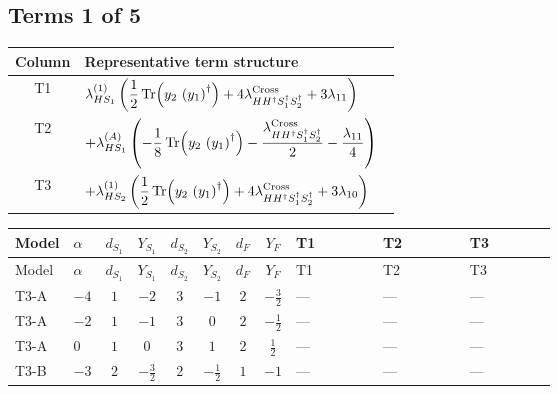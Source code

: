 \documentclass[8pt]{article}
\begin{document}
\begin{landscape}
\subsection*{Terms 1 of 5}
\begin{center}
\begin{tabular}{@{}c >{\raggedright\arraybackslash}p{0.82\linewidth}@{}}
\toprule
Column & Representative term structure \\
\midrule
T1 & \(\displaystyle {\lambda_{HS_1}^{(1)}} \left(\frac{1}{2} \operatorname{Tr}\!\left({y_2}\,\left({y_1}\right)^{\dagger}\right)+4 {\lambda_{H H^\dagger S_1^\dagger S_2^\dagger}^{\rm Cross}}+3 {\lambda_{11}}\right)\) \\
\midrule
T2 & \(\displaystyle +{\lambda_{HS_1}^{(A)}} \left(-\frac{1}{8} \operatorname{Tr}\!\left({y_2}\,\left({y_1}\right)^{\dagger}\right)-\frac{{\lambda_{H H^\dagger S_1^\dagger S_2^\dagger}^{\rm Cross}}}{2}-\frac{{\lambda_{11}}}{4}\right)\) \\
\midrule
T3 & \(\displaystyle +{\lambda_{HS_2}^{(1)}} \left(\frac{1}{2} \operatorname{Tr}\!\left({y_2}\,\left({y_1}\right)^{\dagger}\right)+4 {\lambda_{H H^\dagger S_1^\dagger S_2^\dagger}^{\rm Cross}}+3 {\lambda_{10}}\right)\) \\
\midrule
\bottomrule
\end{tabular}
\end{center}
\smallskip
\tiny
\begin{longtable}{@{}llcccccc >{\raggedright\arraybackslash}p{0.21\linewidth} >{\raggedright\arraybackslash}p{0.21\linewidth} >{\raggedright\arraybackslash}p{0.21\linewidth}@{}}
\toprule
Model & $\alpha$ & $d_{S_1}$ & $Y_{S_1}$ & $d_{S_2}$ & $Y_{S_2}$ & $d_F$ & $Y_F$ & T1 & T2 & T3 \\
\midrule
\endfirsthead
\toprule
Model & $\alpha$ & $d_{S_1}$ & $Y_{S_1}$ & $d_{S_2}$ & $Y_{S_2}$ & $d_F$ & $Y_F$ & T1 & T2 & T3 \\
\midrule
\endhead
T3-A & $-4$ & $1$ & $-2$ & $3$ & $-1$ & $2$ & $-\frac{3}{2}$ & --- & --- & --- \\
\midrule
T3-A & $-2$ & $1$ & $-1$ & $3$ & $0$ & $2$ & $-\frac{1}{2}$ & --- & --- & --- \\
\midrule
T3-A & $0$ & $1$ & $0$ & $3$ & $1$ & $2$ & $\frac{1}{2}$ & --- & --- & --- \\
\midrule
T3-B & $-3$ & $2$ & $-\frac{3}{2}$ & $2$ & $-\frac{1}{2}$ & $1$ & $-1$ & --- & --- & --- \\
\midrule

\end{longtable}
\end{landscape}
\end{document}

